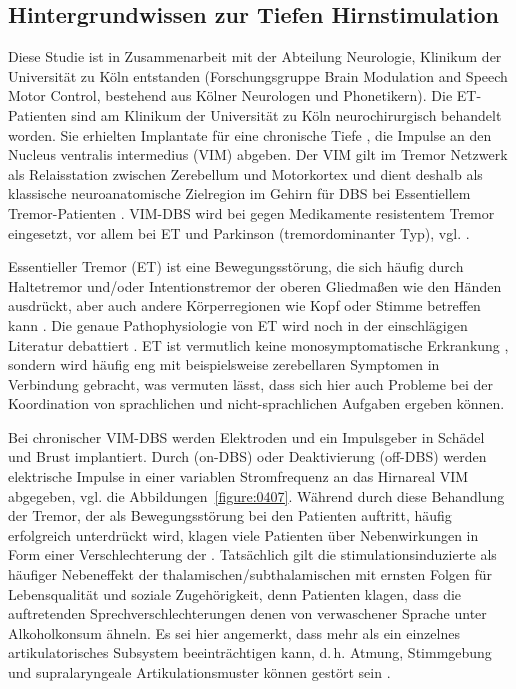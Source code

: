 \subsection{Hintergrundwissen zur Tiefen Hirnstimulation}
\label{subsec:040201}

Diese Studie ist in Zusammenarbeit mit der Abteilung Neurologie, Klinikum der Universität zu Köln entstanden (Forschungsgruppe Brain Modulation and Speech Motor Control, bestehend aus Kölner Neurologen und Phonetikern). Die ET-Patienten sind am Klinikum der Universität zu Köln neurochirurgisch behandelt worden. Sie erhielten Implantate für eine chronische Tiefe , die Impulse an den Nucleus ventralis intermedius (VIM) abgeben. Der VIM gilt im Tremor Netzwerk als Relaisstation zwischen Zerebellum und Motorkortex und dient deshalb als klassische neuroanatomische Zielregion im Gehirn für DBS bei Essentiellem Tremor-Patienten \citep{Schnitzler2009}. VIM-DBS wird bei gegen Medikamente resistentem Tremor eingesetzt, vor allem bei ET und Parkinson (tremordominanter Typ), vgl. \citet{Benabid1996}.

Essentieller Tremor (ET) ist eine Bewegungsstörung, die sich häufig durch Haltetremor und/oder Intentionstremor der oberen Gliedmaßen wie den Händen ausdrückt, aber auch andere Körperregionen wie Kopf oder Stimme betreffen kann \citep{Deuschl2009}. Die genaue Pathophysiologie von ET wird noch in der einschlägigen Literatur debattiert \citep{Elble2013, Raethjen2012, Louis2009, Rajput2012}. ET ist vermutlich keine monosymptomatische Erkrankung \citep{Elble2013}, sondern wird häufig eng mit beispielsweise zerebellaren Symptomen in Verbindung gebracht, was vermuten lässt, dass sich hier auch Probleme bei der Koordination von sprachlichen und nicht-sprachlichen Aufgaben ergeben können.

Bei chronischer VIM-DBS werden Elektroden und ein Impulsgeber in Schädel und Brust implantiert. Durch  (on-DBS) oder Deaktivierung (off-DBS) werden elektrische Impulse in einer variablen Stromfrequenz an das Hirnareal VIM abgegeben, vgl. die Abbildungen~\ref{figure:0407}. Während durch diese Behandlung der Tremor, der als Bewegungsstörung bei den Patienten auftritt, häufig erfolgreich unterdrückt wird, klagen viele Patienten über Nebenwirkungen in Form einer Verschlechterung der  \citep{Benabid1996, Krack2002}. Tatsächlich gilt die stimulationsinduzierte  als häufiger Nebeneffekt der thalamischen/subthalamischen  \citep{Flora2010, Krack2002} mit ernsten Folgen für Lebensqualität und soziale Zugehörigkeit, denn Patienten klagen, dass die auftretenden Sprechverschlechterungen denen von verwaschener Sprache unter Alkoholkonsum ähneln. Es sei hier angemerkt, dass  mehr als ein einzelnes artikulatorisches Subsystem beeinträchtigen kann, d.\,h. Atmung, Stimmgebung und supralaryngeale Artikulationsmuster können gestört sein \citep{Victor2001, Raphael2011}.

